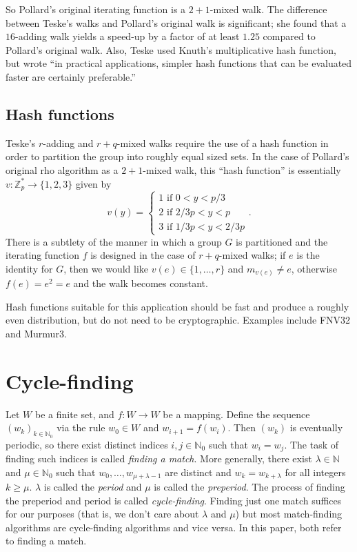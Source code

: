 \documentclass{article}
\newcommand{\ZZ}{\mathbb{Z}}
\newcommand{\NN}{\mathbb{N}}
\begin{document}
So Pollard's original iterating function is a $2+1$-mixed walk. The difference between Teske's walks and Pollard's original walk is significant; she found that a $16$-adding walk yields a speed-up by a factor of at least $1.25$ compared to Pollard's original walk. Also, Teske used Knuth's multiplicative hash function, but wrote ``in practical applications, simpler hash functions that can be evaluated faster are certainly preferable.''

\subsection{Hash functions}

Teske's $r$-adding and $r+q$-mixed walks require the use of a hash function in order to partition the group into roughly equal sized sets. In the case of Pollard's original rho algorithm as a $2+1$-mixed walk, this ``hash function'' is essentially $v: \ZZ_p^* \to \{1,2,3\}$ given by
$$v(y) = \begin{cases}
	1 \text{ if } 0 < y < p/3 \\
	2 \text{ if } 2/3p < y < p \\
	3 \text{ if } 1/3p < y < 2/3p
\end{cases}.$$
There is a subtlety of the manner in which a group $G$ is partitioned and the iterating function $f$ is designed in the case of $r+q$-mixed walks; if $e$ is the identity for $G$, then we would like $v(e) \in \{1,\ldots,r\}$ and $m_{v(e)} \neq e$, otherwise $f(e)=e^2=e$ and the walk becomes constant.

Hash functions suitable for this application should be fast and produce a roughly even distribution, but do not need to be cryptographic. Examples include FNV32 and Murmur3.

\section{Cycle-finding}

Let $W$ be a finite set, and $f: W \to W$ be a mapping. Define the sequence $(w_k)_{k \in \NN_0}$ via the rule $w_0 \in W$ and $w_{i+1} = f(w_i)$. Then $(w_k)$ is eventually periodic, so there exist distinct indices $i,j \in \NN_0$ such that $w_i=w_j$. The task of finding such indices is called \textit{finding a match}. More generally, there exist $\lambda \in \NN$ and $\mu \in \NN_0$ such that $w_0,\ldots,w_{\mu + \lambda - 1}$ are distinct and $w_k = w_{k+\lambda}$ for all integers $k \geq \mu$. $\lambda$ is called the \textit{period} and $\mu$ is called the \textit{preperiod}. The process of finding the preperiod and period is called \textit{cycle-finding}. Finding just one match suffices for our purposes (that is, we don't care about $\lambda$ and $\mu$) but most match-finding algorithms are cycle-finding algorithms and vice versa. In this paper, both refer to finding a match.
\end{document}
